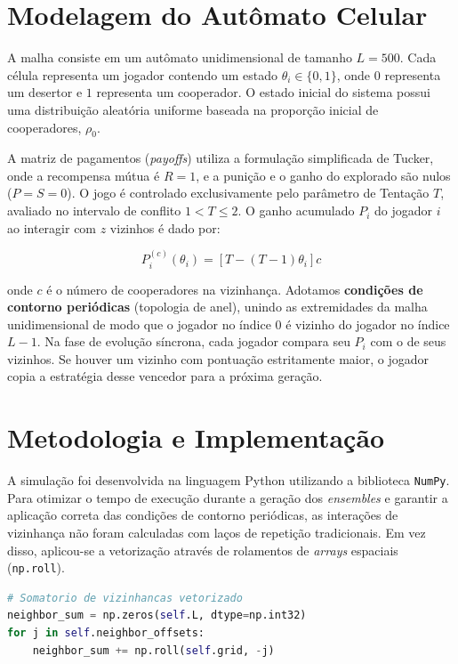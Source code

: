 \documentclass[12pt]{article}
\begin{document}
\section{Modelagem do Autômato Celular}

A malha consiste em um autômato unidimensional de tamanho $L=500$. Cada célula representa um jogador contendo um estado $\theta_{i} \in \{0, 1\}$, onde $0$ representa um desertor e $1$ representa um cooperador. O estado inicial do sistema possui uma distribuição aleatória uniforme baseada na proporção inicial de cooperadores, $\rho_0$. 

A matriz de pagamentos (\textit{payoffs}) utiliza a formulação simplificada de Tucker, onde a recompensa mútua é $R=1$, e a punição e o ganho do explorado são nulos ($P=S=0$). O jogo é controlado exclusivamente pelo parâmetro de Tentação $T$, avaliado no intervalo de conflito $1 < T \le 2$. O ganho acumulado $P_{i}$ do jogador $i$ ao interagir com $z$ vizinhos é dado por:

\begin{equation}
P_{i}^{(c)}(\theta_{i})=[T-(T-1)\theta_{i}]c
\end{equation}

onde $c$ é o número de cooperadores na vizinhança. Adotamos \textbf{condições de contorno periódicas} (topologia de anel), unindo as extremidades da malha unidimensional de modo que o jogador no índice $0$ é vizinho do jogador no índice $L-1$. Na fase de evolução síncrona, cada jogador compara seu $P_{i}$ com o de seus vizinhos. Se houver um vizinho com pontuação estritamente maior, o jogador copia a estratégia desse vencedor para a próxima geração.

\section{Metodologia e Implementação}

A simulação foi desenvolvida na linguagem Python utilizando a biblioteca \texttt{NumPy}. Para otimizar o tempo de execução durante a geração dos \textit{ensembles} e garantir a aplicação correta das condições de contorno periódicas, as interações de vizinhança não foram calculadas com laços de repetição tradicionais. Em vez disso, aplicou-se a vetorização através de rolamentos de \textit{arrays} espaciais (\texttt{np.roll}).

\begin{lstlisting}[language=Python, frame=single, basicstyle=\ttfamily\footnotesize, caption={Vetorização das condições de contorno.}, label=lst:vetorizacao]
# Somatorio de vizinhancas vetorizado
neighbor_sum = np.zeros(self.L, dtype=np.int32)
for j in self.neighbor_offsets:
    neighbor_sum += np.roll(self.grid, -j)
\end{lstlisting}
\end{document}
